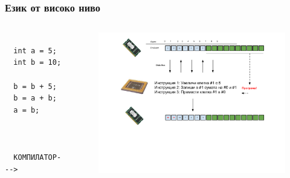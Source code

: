 \documentclass{beamer}
\begin{document}

\begin{frame}[fragile]
\frametitle{Език от високо ниво}

\begin{columns}
  \begin{column}{0.2\textwidth}
\begin{verbatim}

  int a = 5;
  int b = 10;

  b = b + 5;
  b = a + b;
  a = b;



  КОМПИЛАТОР--->

\end{verbatim}
  \end{column}
  \begin{column}{0.8\textwidth}
\begin{figure}
\includegraphics[width=10.5cm]{images/fig_program}
\end{figure}

  \end{column}
\end{columns}


\end{frame} 
\end{document}
